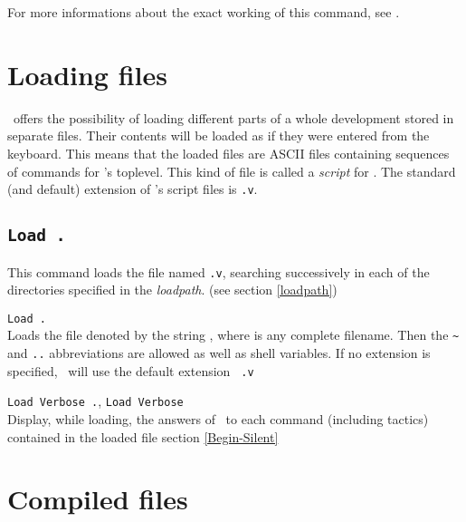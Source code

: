 For more informations about the exact working of this command, see
\cite{Del97}.

\section{Loading files}

\Coq\ offers the possibility of loading different
parts of a whole development stored in separate files. Their contents
will be loaded as if they were entered from the keyboard. This means
that the loaded files are ASCII files containing sequences of commands
for \Coq's toplevel. This kind of file is called a {\em script} for
\Coq{}. The standard (and default) extension of
\Coq's script files is {\tt .v}.

\subsection{\tt Load {\ident}.}
\label{Load}
This command loads the file named {\ident}{\tt .v}, searching
successively in each of the directories specified in the {\em
  loadpath}. (see section \ref{loadpath})

\begin{Variants}
\item {\tt Load {\str}.}\label{Load-str}\\
  Loads the file denoted by the string {\str}, where {\str} is any
  complete filename. Then the \verb.~. and {\tt ..}
  abbreviations are allowed as well as shell variables. If no
  extension is specified, \Coq\ will use the default extension {\tt
    .v}
\item {\tt Load Verbose {\ident}.}, 
  {\tt Load Verbose {\str}}\\
  Display, while loading, the answers of \Coq\ to each command
  (including tactics) contained in the loaded file
  \SeeAlso section \ref{Begin-Silent}
\end{Variants}

\begin{ErrMsgs}
\item {}
\end{ErrMsgs}

\section{Compiled files}\label{compiled}

